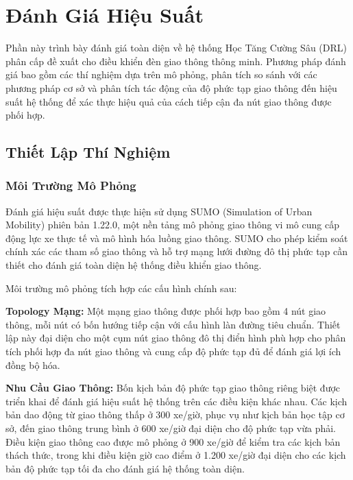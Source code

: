 \section{Đánh Giá Hiệu Suất}\label{sec2b}

Phần này trình bày đánh giá toàn diện về hệ thống Học Tăng Cường Sâu (DRL) phân cấp đề xuất 
cho điều khiển đèn giao thông thông minh. Phương pháp đánh giá bao gồm các thí nghiệm dựa trên 
mô phỏng, phân tích so sánh với các phương pháp cơ sở và phân tích tác động của độ phức tạp giao thông 
đến hiệu suất hệ thống để xác thực hiệu quả của cách tiếp cận đa nút giao thông được phối hợp.

\subsection{Thiết Lập Thí Nghiệm}\label{subsec2b-1}

\subsubsection{Môi Trường Mô Phỏng}

Đánh giá hiệu suất được thực hiện sử dụng SUMO (Simulation of Urban Mobility) phiên bản 1.22.0, 
một nền tảng mô phỏng giao thông vi mô cung cấp động lực xe thực tế và mô hình hóa luồng giao thông. 
SUMO cho phép kiểm soát chính xác các tham số giao thông và hỗ trợ mạng lưới đường đô thị phức tạp 
cần thiết cho đánh giá toàn diện hệ thống điều khiển giao thông.

Môi trường mô phỏng tích hợp các cấu hình chính sau:

\textbf{Topology Mạng:} Một mạng giao thông được phối hợp bao gồm 4 nút giao thông, mỗi nút có bốn 
hướng tiếp cận với cấu hình làn đường tiêu chuẩn. Thiết lập này đại diện cho một cụm nút giao thông 
đô thị điển hình phù hợp cho phân tích phối hợp đa nút giao thông và cung cấp độ phức tạp đủ để đánh giá 
lợi ích đồng bộ hóa.

\textbf{Nhu Cầu Giao Thông:} Bốn kịch bản độ phức tạp giao thông riêng biệt được triển khai để đánh giá 
hiệu suất hệ thống trên các điều kiện khác nhau. Các kịch bản dao động từ giao thông thấp ở 300 xe/giờ, 
phục vụ như kịch bản học tập cơ sở, đến giao thông trung bình ở 600 xe/giờ đại diện cho độ phức tạp vừa phải. 
Điều kiện giao thông cao được mô phỏng ở 900 xe/giờ để kiểm tra các kịch bản thách thức, trong khi điều kiện 
giờ cao điểm ở 1.200 xe/giờ đại diện cho các kịch bản độ phức tạp tối đa cho đánh giá hệ thống toàn diện.

